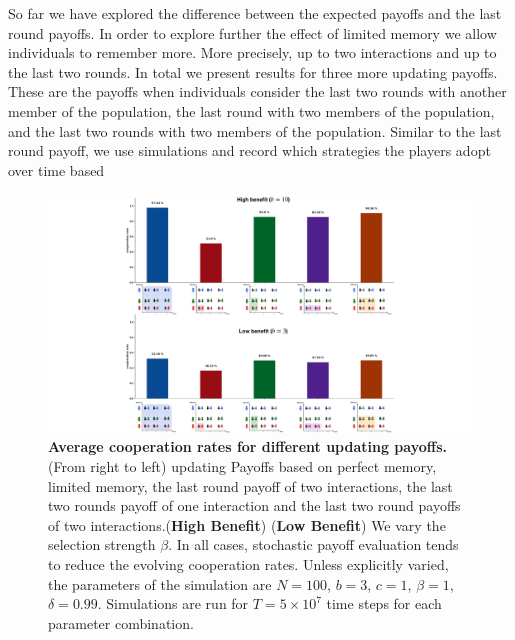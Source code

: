 \documentclass[11pt]{article}
\theoremstyle{plainCl1}
\theoremstyle{plainCl2}
\begin{document}
So far we have explored the difference between the expected payoffs and the last
round payoffs. In order to explore further the effect of limited memory we allow
individuals to remember more. More precisely, up to two interactions and up to
the last two rounds. In total we present results for three more updating
payoffs. These are the payoffs when individuals consider the last two rounds
with another member of the population, the last round with two members of the
population, and the last two rounds with two members of the population. Similar
to the last round payoff, we use simulations and record which strategies the
players adopt over time based


\begin{figure}[!htbp]
  \centering
  \includegraphics[width=\textwidth]{static/more_memory_summary_results.pdf}
  \caption{{\bf Average cooperation rates for different updating payoffs.} (From
  right to left) updating Payoffs based  on perfect memory, limited memory,
  the last round payoff of two interactions,
  the last two rounds payoff of one interaction and 
  the last two round payoffs of two interactions.({\bf High Benefit})
  ({\bf Low Benefit}) We vary the selection strength $\beta$. In all
  cases, stochastic payoff evaluation tends to reduce the evolving cooperation
  rates. Unless explicitly varied, the parameters of the simulation are
  $N\!=\!100$, $b\!=\!3$, $c\!=\!1$, $\beta\!=\!1$, $\delta\!=\!0.99$.
  Simulations are run for $T\!=\!5\times 10^7$ time steps for each parameter
  combination.}\label{fig:cooperation_rate_updating_payoffs}
\end{figure}
\end{document}
